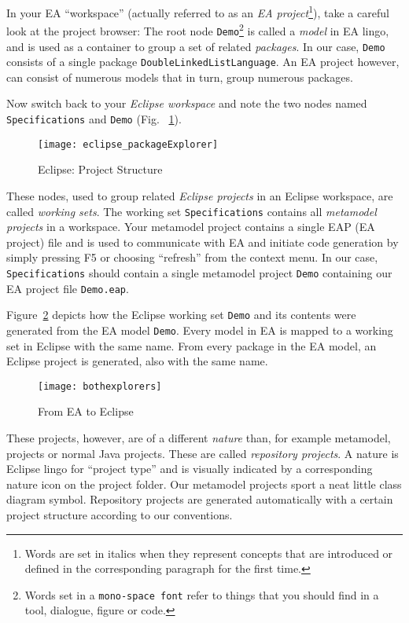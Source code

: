 In your EA ``workspace'' (actually referred to as an \emph{EA project}\footnote{Words are set in italics when they represent concepts that are introduced or defined  in the corresponding paragraph for the first time.}), take a careful  look at the project browser:  The root node \texttt{Demo}\footnote{Words set  in a \texttt{mono-space font} refer to things that you should find in a tool,  dialogue, figure or code.} is called a \emph{model} in EA lingo, and is used as a  container to group a set of related \emph{packages}. 
In our case, \texttt{Demo}  consists of a single package \texttt{DoubleLinkedListLanguage}.
An EA project however, can consist of numerous models that in turn, group numerous packages.

Now switch back to your \emph{Eclipse workspace} and note the two nodes named \texttt{Spe\-ci\-fi\-ca\-tions} and \texttt{Demo} (Fig. ~\ref{fig_eclipsePS}).  

\begin{figure}[htbp]
    \centering
    \texttt{[image: eclipse\_packageExplorer]}
    \caption{Eclipse: Project Structure}
    \label{fig_eclipsePS}
 \end{figure}

These nodes, used to group related \emph{Eclipse projects} in an Eclipse workspace, are called \emph{working sets}. The working set \texttt{Spe\-ci\-fi\-ca\-tions} contains all \emph{metamodel projects} in a  workspace. Your metamodel project contains a single EAP (EA project) file and is used to communicate with EA and initiate code generation by simply pressing F5 or choosing ``refresh'' from the context menu.
In our case, \texttt{Specifications} should contain a single metamodel project \texttt{Demo} containing our EA project file  \texttt{Demo.eap}.
 
Figure~\ref{fig_fromEAtoEclipse} depicts how the Eclipse working set \texttt{Demo} and its contents were generated from the EA model \texttt{Demo}. Every model in EA is mapped to a working set in Eclipse with the same name. From every package in the EA model, an Eclipse project is generated, also with the same name. 

\begin{figure}[htbp]
    \centering
  \texttt{[image: bothexplorers]}
    \caption{From EA to Eclipse}
    \label{fig_fromEAtoEclipse}
\end{figure}

These projects, however, are of a different \emph{nature} than, for example metamodel, projects or normal Java projects. These are called \emph{repository projects}.  
A nature is Eclipse lingo for ``project type'' and is visually indicated by a corresponding nature icon on the project folder.
Our metamodel projects sport a neat little class diagram symbol. 
Repository projects are generated automatically with a certain project structure according to our conventions.  

